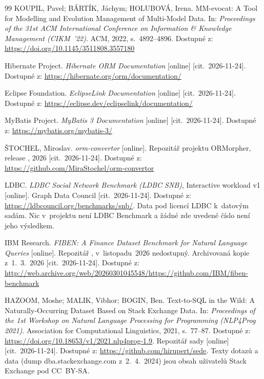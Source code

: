 \begin{thebibliography}{99}
KOUPIL, Pavel; BÁRTÍK, Jáchym; HOLUBOVÁ, Irena. MM-evocat: A Tool for Modelling and Evolution Management of Multi-Model Data. In: \emph{Proceedings of the 31st ACM International Conference on Information \& Knowledge Management (CIKM~'22)}. ACM, 2022, s.~4892--4896. Dostupné z: \url{https://doi.org/10.1145/3511808.3557180}

Hibernate Project. \emph{Hibernate ORM Documentation} [online] [cit.~\mbox{2026-11-24}]. Dostupné z: \url{https://hibernate.org/orm/documentation/}

Eclipse Foundation. \emph{EclipseLink Documentation} [online] [cit.~\mbox{2026-11-24}]. Dostupné z: \url{https://eclipse.dev/eclipselink/documentation/}

MyBatis Project. \emph{MyBatis 3 Documentation} [online] [cit.~\mbox{2026-11-24}]. Dostupné z: \url{https://mybatis.org/mybatis-3/}

ŠTOCHEL, Miroslav. \emph{orm-convertor} [online]. Repozitář projektu ORMorpher, release \Vydani, 2026 [cit.~\mbox{2026-11-24}]. Dostupné z: \url{https://github.com/MiraStochel/orm-convertor}

LDBC. \emph{LDBC Social Network Benchmark (LDBC SNB)}, Interactive workload v1 [online]. Graph Data Council [cit.~\mbox{2026-11-24}]. Dostupné z: \url{https://ldbcouncil.org/benchmarks/snb/}. Data pod licencí LDBC k~datovým sadám. Nic v~projektu není LDBC Benchmark a žádné zde uvedené číslo není jeho výsledkem.

IBM Research. \emph{FIBEN: A Finance Dataset Benchmark for Natural Language Queries} [online]. Repozitář , v~listopadu~2026 nedostupný. Archivovaná kopie z~1.~3.~2026 [cit.~\mbox{2026-11-24}]. Dostupné z: \url{http://web.archive.org/web/20260301045548/https://github.com/IBM/fiben-benchmark}

HAZOOM, Moshe; MALIK, Vibhor; BOGIN, Ben. Text-to-SQL in the Wild: A Naturally-Occurring Dataset Based on Stack Exchange Data. In: \emph{Proceedings of the 1st Workshop on Natural Language Processing for Programming (NLP4Prog 2021)}. Association for Computational Linguistics, 2021, s.~77--87. Dostupné z: \url{https://doi.org/10.18653/v1/2021.nlp4prog-1.9}. Repozitář sady [online] [cit.~\mbox{2026-11-24}]. Dostupné z: \url{https://github.com/hirupert/sede}. Texty dotazů a data (dump dba.stackexchange.com z~2.~4.~2024) jsou obsah uživatelů Stack Exchange pod CC~\mbox{BY-SA}.


\end{thebibliography}
